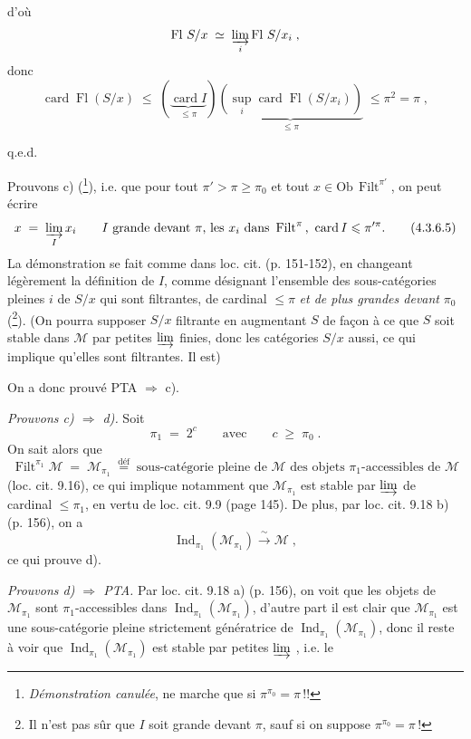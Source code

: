 \documentclass[11pt]{article}
\newcommand{\printedpage}[1]{\if\relax\detokenize{#1}\relax\else\marginpar{\footnotesize p.~#1}\fi}
\newcommand{\msp}[1]{\marginpar{\footnotesize [#1]}}
\newcommand{\Ob}{\mathrm{Ob}\,}
\newcommand{\card}{\operatorname{card}}
\newcommand{\Fl}{\operatorname{Fl}}
\newcommand{\Filt}{\operatorname{Filt}}
\newcommand{\Ind}{\operatorname{Ind}}
\begin{document}
\setcounter{footnote}{11}

\printedpage{14}

d'où
\[
\Fl\,S/x \;\simeq\; \varinjlim_{i} \Fl\,S/x_i \;,
\]
donc
\[
\card\Fl(S/x) \;\leqslant\; (\underbrace{\card I}_{\leqslant\pi})\underbrace{(\sup_{i}\card\Fl(S/x_i))}_{\leqslant\pi} \;\leqslant \pi^2 = \pi \;,
\]

\hfill q.e.d.

\msp{page 76}
Prouvons c) (\footnote{\textit{Démonstration canulée}, ne marche que si $\pi^{\pi_0} = \pi$\,!!}), i.e. que pour tout $\pi' > \pi \geqslant \pi_0$ et tout $x \in \Ob\Filt^{\pi'}$, on peut écrire
\[
x \;=\; \varinjlim_{I} x_i \qquad I \text{ grande devant } \pi\text{, les } x_i \text{ dans } \Filt^{\pi}\text{, } \card I \leqslant \pi'^{\pi}. \tag*{(4.3.6.5)}
\]
La démonstration se fait comme dans loc. cit. (p. 151-152), en changeant légèrement la définition de $I$, comme désignant l'ensemble des sous-catégories pleines $i$ de $S/x$ qui sont filtrantes, de cardinal $\leqslant \pi$ \textit{et de plus grandes devant} $\pi_0$ (\footnote{Il n'est pas sûr que $I$ soit grande devant $\pi$, sauf si on suppose $\pi^{\pi_0} = \pi$\,!}). (On pourra supposer $S/x$ filtrante en augmentant $S$ de façon à ce que $S$ soit stable dans $\mathcal{M}$ par petites $\varinjlim$ finies, donc les catégories $S/x$ aussi, ce qui implique qu'elles sont filtrantes. Il est)

On a donc prouvé PTA $\Longrightarrow$ c).

\textit{Prouvons c) $\Longrightarrow$ d).} Soit
\[
\pi_1 \;=\; 2^c \qquad \text{avec} \qquad c \;\geqslant\; \pi_0 \;.
\]
On sait alors que
\[
\Filt^{\pi_1}\mathcal{M} \;=\; \mathcal{M}_{\pi_1} \;\overset{\text{déf}}{=}\; \text{sous-catégorie pleine de $\mathcal{M}$ des objets $\pi_1$-accessibles de $\mathcal{M}$}
\]
(loc. cit. 9.16), ce qui implique notamment que $\mathcal{M}_{\pi_1}$ est stable par $\varinjlim$ de cardinal $\leqslant \pi_1$, en vertu de loc. cit. 9.9 (page 145). De plus,
\msp{page 77}
par loc. cit. 9.18 b) (p. 156), on a
\[
\Ind_{\pi_1}(\mathcal{M}_{\pi_1}) \xrightarrow{\;\sim\;} \mathcal{M} \;,
\]
ce qui prouve d).

\textit{Prouvons d) $\Longrightarrow$ PTA.} Par loc. cit. 9.18 a) (p. 156), on voit que les objets de $\mathcal{M}_{\pi_1}$ sont $\pi_1$-accessibles dans $\Ind_{\pi_1}(\mathcal{M}_{\pi_1})$, d'autre part il est clair que $\mathcal{M}_{\pi_1}$ est une sous-catégorie pleine strictement génératrice de $\Ind_{\pi_1}(\mathcal{M}_{\pi_1})$, donc il reste à voir que $\Ind_{\pi_1}(\mathcal{M}_{\pi_1})$ est stable par petites $\varinjlim$ , i.e. le
\end{document}
